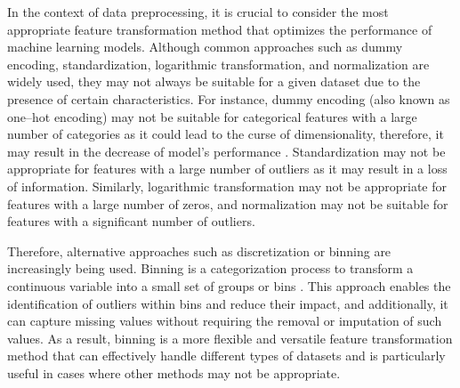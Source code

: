 In the context of data preprocessing, it is crucial to consider the most appropriate feature transformation method that optimizes the performance of machine learning models.
Although common approaches such as dummy encoding, standardization, logarithmic transformation, and normalization are widely used, they may not always be suitable for a given dataset due to the presence of certain characteristics.
For instance, dummy encoding (also known as one--hot encoding) may not be suitable for categorical features with a large number of categories as it could lead to the curse of dimensionality, therefore, it may result in the decrease of model's performance \citep{bera2021dimensionality}.
Standardization may not be appropriate for features with a large number of outliers as it may result in a loss of information.
Similarly, logarithmic transformation may not be appropriate for features with a large number of zeros, and normalization may not be suitable for features with a significant number of outliers.

Therefore, alternative approaches such as discretization or binning are increasingly being used. Binning is a categorization process to transform a continuous variable into a small set of groups or bins \citep{zeng2014necessary}. This approach enables the identification of outliers within bins and reduce their impact, and additionally, it can capture missing values without requiring the removal or imputation of such values.
As a result, binning is a more flexible and versatile feature transformation method that can effectively handle different types of datasets and is particularly useful in cases where other methods may not be appropriate.

